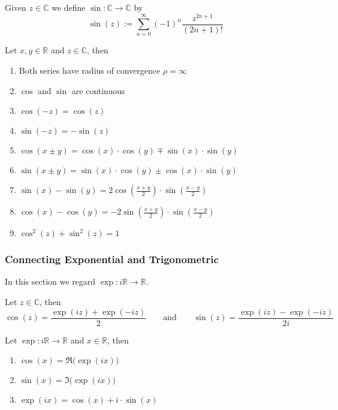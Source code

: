 \begin{definition}[Sine]
   Given \(z \in \mathbb{C}\) we define \(\sin: \mathbb{C} \to \mathbb{C}\) by
   \[\sin(z) := \sum_{n=0}^\infty (-1)^n \frac{z^{2n + 1}}{(2n+1)!}\]
\end{definition}

\begin{proposition}[Properties]
   Let \(x, y \in \mathbb{R}\) and \(z \in \mathbb{C}\), then
   \begin{enumerate}[label=\roman*, align=Center]
      \item Both series have radius of convergence \(\rho = \infty\)
      \item \(\cos\) and \(\sin\) are continuous
      \item \(\cos(-z) = \cos(z)\)
      \item \(\sin(-z) = -\sin(z)\)
      \item \(\cos(x \pm y) = \cos(x) \cdot \cos(y) \mp \sin(x) \cdot \sin(y)\)
      \item \(\sin(x \pm y) = \sin(x) \cdot \cos(y) \pm \cos(x) \cdot \sin(y)\)
      \item \(\sin(x) - \sin(y) = 2 \cos\left(\frac{x+y}{2}\right) \cdot \sin\left(\frac{x-y}{2}\right)\)
      \item \(\cos(x) - \cos(y) = -2 \sin\left(\frac{x+y}{2}\right) \cdot \sin\left(\frac{x-y}{2}\right)\)
      \item \(\cos^2(z) + \sin^2(z) = 1\)
   \end{enumerate}
\end{proposition}

\subsubsection{Connecting Exponential and Trigonometric}
In this section we regard \(\exp: i\mathbb{R} \to \mathbb{R}\).

\begin{proposition}
   Let \(z \in \mathbb{C}\), then
   \[\cos(z) = \frac{\exp(iz) + \exp(-iz)}{2} \qquad\text{and}\qquad \sin(z) = \frac{\exp(iz) - \exp(-iz)}{2i}\]
\end{proposition}

\begin{proposition}
   Let \(\exp: i\mathbb{R} \to \mathbb{R}\) and \(x \in \mathbb{R}\), then
   \begin{enumerate}[label=\roman*, align=Center]
      \item \(\cos(x) = \Re\big(\exp(ix)\big)\)
      \item \(\sin(x) = \Im\big(\exp(ix)\big)\)
      \item \(\exp(ix) = \cos(x) + i \cdot \sin(x)\)
   \end{enumerate}
\end{proposition}

